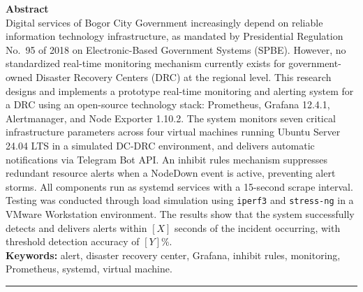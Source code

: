 \documentclass[10pt,twocolumn]{article}
\begin{document}
{\begin{@twocolumnfalse}
  \noindent\textbf{Abstract}\\[4pt]
  \noindent\small
  Digital services of Bogor City Government increasingly depend on reliable information technology
  infrastructure, as mandated by Presidential Regulation No.\ 95 of 2018 on Electronic-Based
  Government Systems (SPBE). However, no standardized real-time monitoring mechanism currently exists
  for government-owned Disaster Recovery Centers (DRC) at the regional level. This research designs
  and implements a prototype real-time monitoring and alerting system for a DRC using an open-source
  technology stack: Prometheus, Grafana 12.4.1, Alertmanager, and Node Exporter 1.10.2. The system
  monitors seven critical infrastructure parameters across four virtual machines running Ubuntu Server
  24.04 LTS in a simulated DC-DRC environment, and delivers automatic notifications via Telegram Bot
  API. An inhibit rules mechanism suppresses redundant resource alerts when a NodeDown event is
  active, preventing alert storms. All components run as systemd services with a 15-second scrape
  interval. Testing was conducted through load simulation using \texttt{iperf3} and \texttt{stress-ng}
  in a VMware Workstation environment. The results show that the system successfully detects and
  delivers alerts within $[\mathit{X}]$ seconds of the incident occurring, with threshold detection
  accuracy of $[\mathit{Y}]$\%.\\[4pt]

  \noindent\textbf{Keywords:} alert, disaster recovery center, Grafana, inhibit rules, monitoring,
  Prometheus, systemd, virtual machine.

  \vspace{8pt}
  \hrule
  \vspace{6pt}


\end{@twocolumnfalse}}
\end{document}
